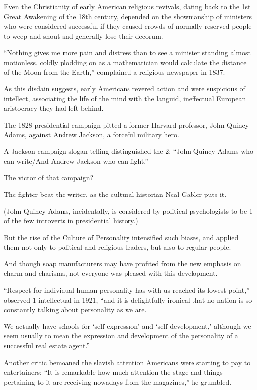 \documentclass[oneside]{article}
\numberwithin{equation}{section}
\begin{document}
Even the Christianity of early American religious revivals, dating back to the 1st Great Awakening of the 18th century, depended on the showmanship of ministers who were considered successful if they caused crowds of normally reserved people to weep and shout and generally lose their decorum.

``Nothing gives me more pain and distress than to see a minister standing almost motionless, coldly plodding on as a mathematician would calculate the distance of the Moon from the Earth,'' complained a religious newspaper in 1837.

%
As this disdain suggests, early Americans revered action and were suspicious of intellect, associating the life of the mind with the languid, ineffectual European aristocracy they had left behind.

The 1828 presidential campaign pitted a former Harvard professor, John Quincy Adams, against Andrew Jackson, a forceful military hero.

A Jackson campaign slogan telling distinguished the 2: ``John Quincy Adams who can write/And Andrew Jackson who can fight.''

%
The victor of that campaign?

The fighter beat the writer, as the cultural historian Neal Gabler puts it.

(John Quincy Adams, incidentally, is considered by political psychologists to be 1 of the few introverts in presidential history.)

%
But the rise of the Culture of Personality intensified such biases, and applied them not only to political and religious leaders, but also to regular people.

And though soap manufacturers may have profited from the new emphasis on charm and charisma, not everyone was pleased with this development.

``Respect for individual human personality has with us reached its lowest point,'' observed 1 intellectual in 1921, ``and it is delightfully ironical that no nation is so constantly talking about personality as we are.

We actually have schools for `self-expression' and `self-development,' although we seem usually to mean the expression and development of the personality of a successful real estate agent.''

%
Another critic bemoaned the slavish attention Americans were starting to pay to entertainers: ``It is remarkable how much attention the stage and things pertaining to it are receiving nowadays from the magazines,'' he grumbled.
\end{document}
